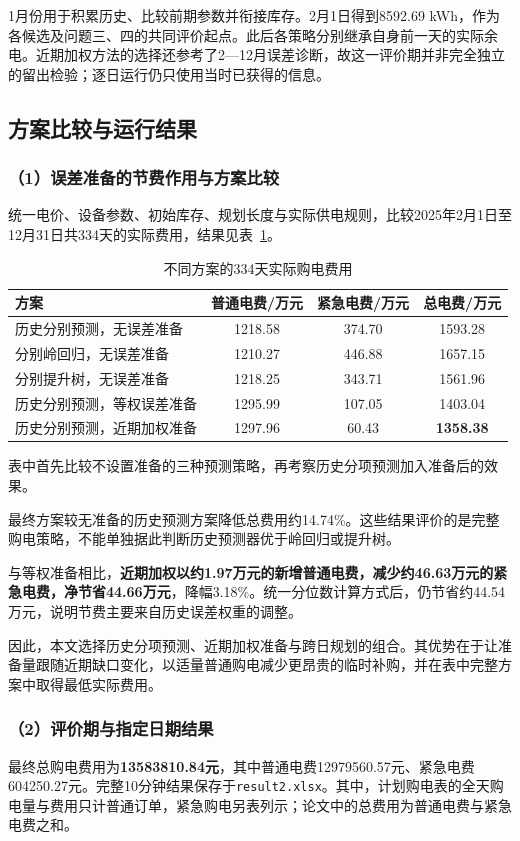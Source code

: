 1月份用于积累历史、比较前期参数并衔接库存。2月1日得到8592.69 kWh，作为各候选及问题三、四的共同评价起点。此后各策略分别继承自身前一天的实际余电。近期加权方法的选择还参考了2—12月误差诊断，故这一评价期并非完全独立的留出检验；逐日运行仍只使用当时已获得的信息。

\subsection{方案比较与运行结果}
\subsubsection*{（1）误差准备的节费作用与方案比较}
统一电价、设备参数、初始库存、规划长度与实际供电规则，比较2025年2月1日至12月31日共334天的实际费用，结果见表~\ref{tab:q2_model_compare}。

\begin{table}[!htbp]
\centering
\caption{不同方案的334天实际购电费用}
\label{tab:q2_model_compare}
\begin{tabular}{lccc}
\hline
方案 & 普通电费/万元 & 紧急电费/万元 & 总电费/万元 \\
\hline
历史分别预测，无误差准备
& 1218.58 & 374.70 & 1593.28 \\
分别岭回归，无误差准备
& 1210.27 & 446.88 & 1657.15 \\
分别提升树，无误差准备
& 1218.25 & 343.71 & 1561.96 \\
历史分别预测，等权误差准备
& 1295.99 & 107.05 & 1403.04 \\
历史分别预测，近期加权准备
& 1297.96 & 60.43 & \textbf{1358.38} \\
\hline
\end{tabular}
\end{table}

表中首先比较不设置准备的三种预测策略，再考察历史分项预测加入准备后的效果。

最终方案较无准备的历史预测方案降低总费用约14.74\%。这些结果评价的是完整购电策略，不能单独据此判断历史预测器优于岭回归或提升树。

与等权准备相比，\textbf{近期加权以约1.97万元的新增普通电费，减少约46.63万元的紧急电费，净节省44.66万元}，降幅3.18\%。统一分位数计算方式后，仍节省约44.54万元，说明节费主要来自历史误差权重的调整。

因此，本文选择历史分项预测、近期加权准备与跨日规划的组合。其优势在于让准备量跟随近期缺口变化，以适量普通购电减少更昂贵的临时补购，并在表中完整方案中取得最低实际费用。

\subsubsection*{（2）评价期与指定日期结果}
最终总购电费用为\textbf{13583810.84元}，其中普通电费12979560.57元、紧急电费604250.27元。完整10分钟结果保存于\texttt{result2.xlsx}。其中，计划购电表的全天购电量与费用只计普通订单，紧急购电另表列示；论文中的总费用为普通电费与紧急电费之和。

